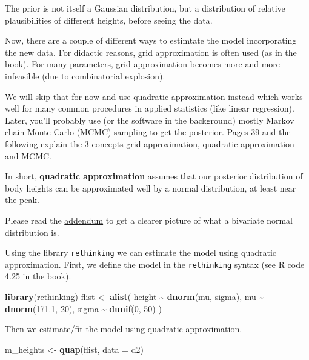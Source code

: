 \documentclass[
]{book}
\newenvironment{Shaded}{\begin{snugshade}}{\end{snugshade}}
\newcommand{\AttributeTok}[1]{\textcolor[rgb]{0.13,0.29,0.53}{#1}}
\newcommand{\DecValTok}[1]{\textcolor[rgb]{0.00,0.00,0.81}{#1}}
\newcommand{\FloatTok}[1]{\textcolor[rgb]{0.00,0.00,0.81}{#1}}
\newcommand{\FunctionTok}[1]{\textcolor[rgb]{0.13,0.29,0.53}{\textbf{#1}}}
\newcommand{\NormalTok}[1]{#1}
\newcommand{\OtherTok}[1]{\textcolor[rgb]{0.56,0.35,0.01}{#1}}
\newcommand{\SpecialCharTok}[1]{\textcolor[rgb]{0.81,0.36,0.00}{\textbf{#1}}}
\begin{document}
The prior is not itself a Gaussian distribution, but a distribution of
relative plausibilities of different heights, before seeing the data.

Now, there are a couple of different ways to estimtate the model incorporating
the new data. For didactic reasons, grid approximation is often used (as in the book).
For many parameters, grid approximation becomes more and more infeasible (due to combinatorial explosion).

We will skip that for now and use quadratic approximation instead which
works well for many common procedures in applied statistics (like linear regression).
Later, you'll probably use (or the software in the background) mostly Markov
chain Monte Carlo (MCMC) sampling to get the posterior.
\href{https://civil.colorado.edu/~balajir/CVEN6833/bayes-resources/RM-StatRethink-Bayes.pdf}{Pages 39 and the following}
explain the 3 concepts grid approximation, quadratic approximation and MCMC.

In short, \textbf{quadratic approximation} assumes that our posterior distribution
of body heights can be approximated well by a normal distribution,
at least near the peak.

Please read the \hyperref[bivariate_normal]{addendum} to get a clearer picture of
what a bivariate normal distribution is.

Using the library \texttt{rethinking} we can estimate the model using quadratic approximation.
First, we define the model in the \texttt{rethinking} syntax (see R code 4.25 in the book).

\begin{Shaded}
\begin{Highlighting}[]
\FunctionTok{library}\NormalTok{(rethinking)}
\NormalTok{flist }\OtherTok{\textless{}{-}} \FunctionTok{alist}\NormalTok{(}
\NormalTok{  height }\SpecialCharTok{\textasciitilde{}} \FunctionTok{dnorm}\NormalTok{(mu, sigma),}
\NormalTok{  mu }\SpecialCharTok{\textasciitilde{}} \FunctionTok{dnorm}\NormalTok{(}\FloatTok{171.1}\NormalTok{, }\DecValTok{20}\NormalTok{),}
\NormalTok{  sigma }\SpecialCharTok{\textasciitilde{}} \FunctionTok{dunif}\NormalTok{(}\DecValTok{0}\NormalTok{, }\DecValTok{50}\NormalTok{)}
\NormalTok{)}
\end{Highlighting}
\end{Shaded}

Then we estimate/fit the model using quadratic approximation.

\begin{Shaded}
\begin{Highlighting}[]
\NormalTok{m\_heights }\OtherTok{\textless{}{-}} \FunctionTok{quap}\NormalTok{(flist, }\AttributeTok{data =}\NormalTok{ d2)}
\end{Highlighting}
\end{Shaded}
\end{document}
